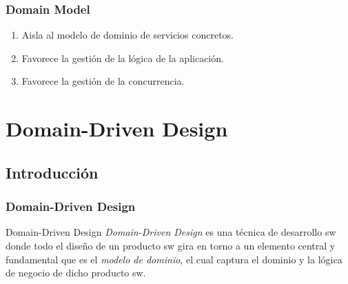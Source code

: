 \documentclass[a4paper,slidestop,xcolor=pst,dvips,blue]{beamer}
\begin{document}
\begin{frame}[c]
    \frametitle{Domain Model}
    \begin{enumerate}
        \item<2-> Aisla al modelo de dominio de servicios concretos.
        \item<3-> Favorece la gestión de la lógica de la aplicación.
        \item<3-> Favorece la gestión de la concurrencia.
    \end{enumerate}
\end{frame}

\section{Domain-Driven Design}

\subsection{Introducción}

\begin{frame}[c]
    \frametitle{Domain-Driven Design}
     \begin{block}{Domain-Driven Design}
     \alert{\emph{Domain-Driven Design}} es una técnica de desarrollo sw donde todo el diseño de un producto sw gira en torno a un elemento central y fundamental que es el \emph{modelo de dominio}, el cual captura el dominio y la lógica de negocio de dicho producto sw.
     \end{block}
\end{frame}
\end{document}
